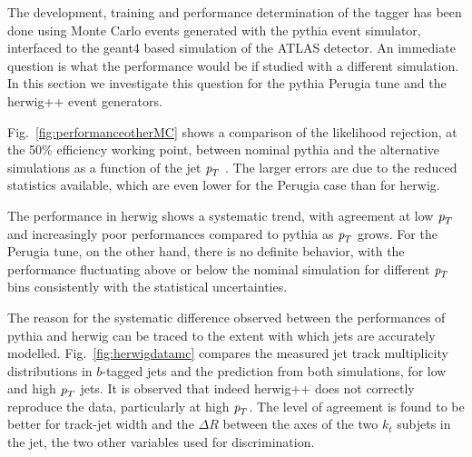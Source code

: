 The development, training and performance determination of the tagger has been done using Monte Carlo events generated with the {\sc pythia} event simulator, interfaced to the {\sc geant4} based simulation of the ATLAS detector. An immediate question is what the performance would be if studied with a different simulation. In this section we investigate this question for the {\sc pythia} Perugia tune  and the {\sc herwig++} event generators.

Fig.~\ref{fig:performanceotherMC} shows a comparison of the likelihood rejection, at the 50\% efficiency working point,  between nominal {\sc pythia} and the alternative simulations %
as a function of the jet ${\emph{p}_{T}}$ . The larger errors are due to the reduced statistics available, which are even lower for the Perugia case than for {\sc herwig}.




The performance in {\sc herwig} shows a systematic trend, with agreement at low ${\emph{p}_{T}}$ and increasingly poor performances compared to {\sc pythia} as ${\emph{p}_{T}}$ grows. For the Perugia tune, on the other hand, there is no definite behavior, with the performance fluctuating above or below the nominal simulation for different ${\emph{p}_{T}}$ bins consistently with the statistical uncertainties.

The reason for the systematic difference observed between the performances of {\sc pythia} and {\sc herwig} can be traced to the extent with which jets are accurately modelled. Fig.~\ref{fig:herwigdatamc} compares the measured jet track multiplicity distributions in $b$-tagged jets and the prediction from both simulations, for low and high ${\emph{p}_{T}}$ jets. It is observed that indeed {\sc herwig++} does not correctly reproduce the data, particularly at high ${\emph{p}_{T}}$. The level of agreement is found to be better for track-jet width and the $\Delta R$ between the axes of the two $k_t$ subjets in the jet, the two other variables used for discrimination.






